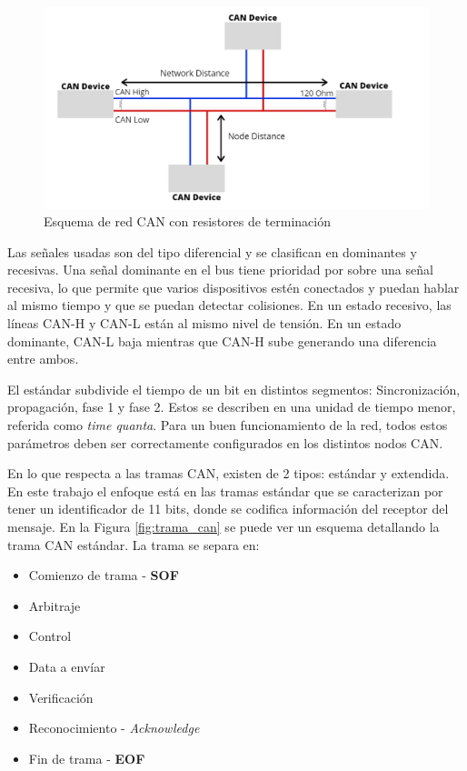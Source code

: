 \begin{figure}[htbp]
	\centering
	\includegraphics[scale=.6]{./Figures/canBus.png}
	\caption{Esquema de red CAN con resistores de terminación\protect\footnotemark}
	\label{fig:red_can_con_resistores}
\end{figure}


Las señales usadas son del tipo diferencial y se clasifican en dominantes y recesivas. Una señal dominante en el bus tiene prioridad por sobre una señal recesiva, lo que permite que varios dispositivos estén conectados y puedan hablar al mismo tiempo y que se puedan detectar colisiones\citep{Embedded_Networking_CAN}. En un estado recesivo, las líneas CAN-H y CAN-L están al mismo nivel de tensión. En un estado dominante, CAN-L baja mientras que CAN-H sube generando una diferencia entre ambos. 

El estándar subdivide el tiempo de un bit en distintos segmentos: Sincronización, propagación, fase 1 y fase 2. Estos se describen en una unidad de tiempo menor, referida como \textit{time quanta}. Para un buen funcionamiento de la red, todos estos parámetros deben ser correctamente configurados en los distintos nodos CAN.

En lo que respecta a las tramas CAN, existen de 2 tipos: estándar y extendida. En este trabajo el enfoque está en las tramas estándar que se caracterizan por tener un identificador de 11 bits, donde se codifica información del receptor del mensaje. En la Figura \ref{fig:trama_can} se puede ver un esquema detallando la trama CAN estándar. La trama se separa en:
\begin{itemize}
	\item Comienzo de trama - \textbf{SOF}
	\item Arbitraje
	\item Control
	\item Data a envíar
	\item Verificación
	\item Reconocimiento - \textit{Acknowledge}
	\item Fin de trama - \textbf{EOF}
\end{itemize} 

